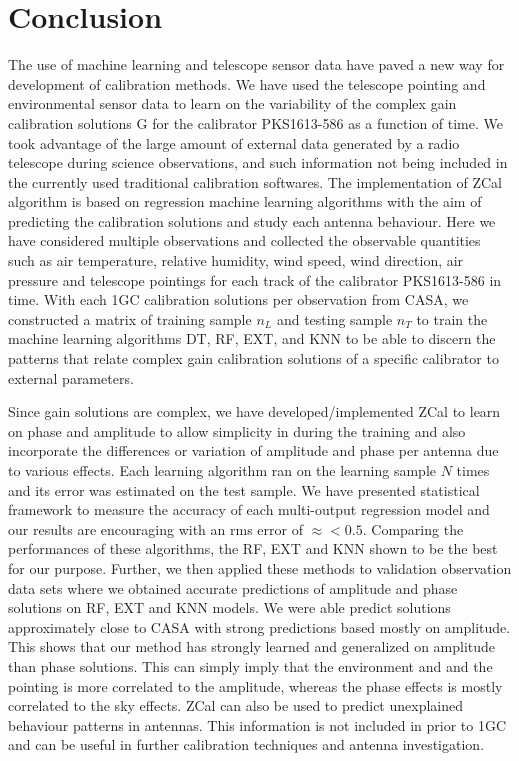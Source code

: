 \chapter{Conclusion}

The use of machine learning and telescope sensor data have paved a new way for development of calibration methods. We have used the telescope pointing and environmental sensor data to learn on the variability of the complex gain calibration solutions G for the calibrator PKS1613-586 as a function of time. We took advantage of the large amount of external data generated by a radio telescope during science observations, and such information not being included in the currently used traditional calibration softwares. The implementation of  ZCal algorithm is based on regression machine learning algorithms with the aim of predicting the calibration solutions and study each antenna behaviour. Here we have considered multiple observations and collected the observable quantities such as air temperature, relative humidity, wind speed, wind direction, air pressure and telescope pointings for each track of the calibrator PKS1613-586 in time. With each 1GC calibration solutions per observation from CASA, we constructed a matrix of training sample $n_L$ and testing sample $n_T$ to train the machine learning algorithms DT, RF, EXT, and KNN to be able to discern the patterns that relate complex gain  calibration solutions of a specific calibrator to external parameters.       

Since gain solutions are complex, we have developed/implemented  ZCal to learn on phase and amplitude to allow simplicity in during the training and also incorporate the differences or variation of amplitude and phase per antenna due to various effects. Each learning algorithm ran on the learning sample $N$ times and its error was estimated on the test sample. We have presented statistical framework to measure the accuracy of each multi-output regression model and our results are encouraging with an rms error of $\approx < 0.5$. Comparing the performances of these algorithms, the RF, EXT and KNN shown to be the best for our purpose. Further, we then applied these methods to validation observation data sets where we obtained accurate predictions of amplitude and phase solutions on RF, EXT and KNN models. We were able predict solutions approximately close to CASA with strong predictions based mostly on amplitude. This shows that our method has strongly learned and generalized on amplitude than phase solutions. This can simply imply that the environment and and the pointing is more correlated to the amplitude, whereas the phase effects is mostly correlated to the sky effects. ZCal can also be used to predict unexplained behaviour patterns in antennas. This information is not included in prior to 1GC and can be useful in further calibration techniques and antenna investigation.

